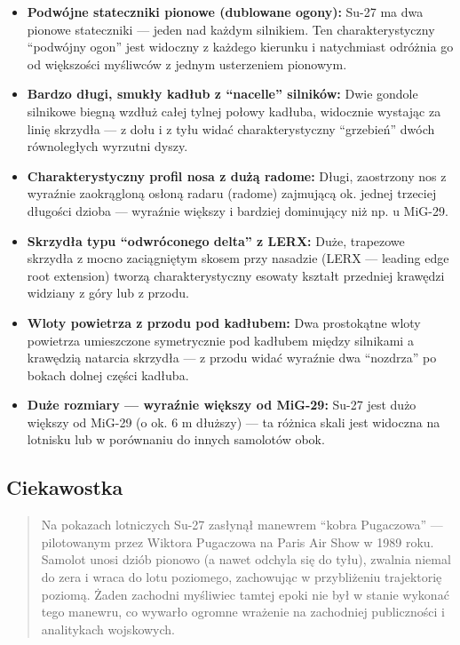 \documentclass[12pt,oneside]{book}
\providecommand{\tightlist}{%
  \setlength{\itemsep}{0pt}\setlength{\parskip}{0pt}}
\begin{document}
\begin{itemize}
\tightlist
\item
  \textbf{Podwójne stateczniki pionowe (dublowane ogony):} Su-27 ma dwa
  pionowe stateczniki --- jeden nad każdym silnikiem. Ten
  charakterystyczny ``podwójny ogon'' jest widoczny z każdego kierunku i
  natychmiast odróżnia go od większości myśliwców z jednym usterzeniem
  pionowym.
\item
  \textbf{Bardzo długi, smukły kadłub z ``nacelle'' silników:} Dwie
  gondole silnikowe biegną wzdłuż całej tylnej połowy kadłuba, widocznie
  wystając za linię skrzydła --- z dołu i z tyłu widać charakterystyczny
  ``grzebień'' dwóch równoległych wyrzutni dyszy.
\item
  \textbf{Charakterystyczny profil nosa z dużą radome:} Długi,
  zaostrzony nos z wyraźnie zaokrągloną osłoną radaru (radome) zajmującą
  ok. jednej trzeciej długości dzioba --- wyraźnie większy i bardziej
  dominujący niż np. u MiG-29.
\item
  \textbf{Skrzydła typu ``odwróconego delta'' z LERX:} Duże, trapezowe
  skrzydła z mocno zaciągniętym skosem przy nasadzie (LERX --- leading
  edge root extension) tworzą charakterystyczny esowaty kształt
  przedniej krawędzi widziany z góry lub z przodu.
\item
  \textbf{Wloty powietrza z przodu pod kadłubem:} Dwa prostokątne wloty
  powietrza umieszczone symetrycznie pod kadłubem między silnikami a
  krawędzią natarcia skrzydła --- z przodu widać wyraźnie dwa
  ``nozdrza'' po bokach dolnej części kadłuba.
\item
  \textbf{Duże rozmiary --- wyraźnie większy od MiG-29:} Su-27 jest dużo
  większy od MiG-29 (o ok. 6 m dłuższy) --- ta różnica skali jest
  widoczna na lotnisku lub w porównaniu do innych samolotów obok.
\end{itemize}

\subsection{Ciekawostka}\label{ciekawostka-58}

\begin{quote}
Na pokazach lotniczych Su-27 zasłynął manewrem ``kobra Pugaczowa'' ---
pilotowanym przez Wiktora Pugaczowa na Paris Air Show w 1989 roku.
Samolot unosi dziób pionowo (a nawet odchyla się do tyłu), zwalnia
niemal do zera i wraca do lotu poziomego, zachowując w przybliżeniu
trajektorię poziomą. Żaden zachodni myśliwiec tamtej epoki nie był w
stanie wykonać tego manewru, co wywarło ogromne wrażenie na zachodniej
publiczności i analitykach wojskowych.
\end{quote}
\end{document}
